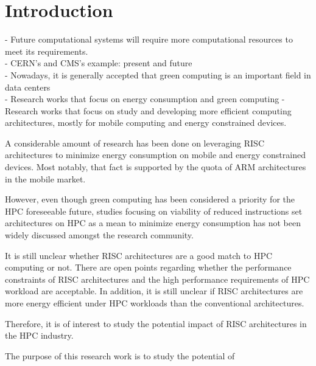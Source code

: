 \chapter{Introduction}


- Future computational systems will require more computational resources to meet 
its requirements.  \\
- CERN's and CMS's example: present and future \\
- Nowadays, it is generally accepted that green computing is an important field
  in data centers \\ 
- Research works that focus on energy consumption and green computing
- Research works that focus on study and developing more efficient computing 
architectures, mostly for mobile computing and energy constrained devices.


A considerable amount of research has been done on leveraging RISC architectures
to minimize energy consumption on mobile and energy constrained devices. Most
notably, that fact is supported by the quota of ARM architectures in the mobile
market.

However, even though green computing has been considered a priority for the 
HPC foreseeable future, studies focusing on viability of reduced instructions set 
architectures on HPC as a mean to minimize energy consumption has not been widely 
discussed amongst the research community. 

It is still unclear whether RISC architectures are a good match to HPC
computing or not. There are open points regarding whether the performance 
constraints of RISC architectures and the high performance requirements of HPC 
workload are acceptable. In addition, it is still unclear if RISC architectures
are more energy efficient under HPC workloads than the conventional
architectures.

Therefore, it is of interest to study the potential impact of RISC architectures in 
the HPC industry.


The purpose of this research work is to study the potential of 


